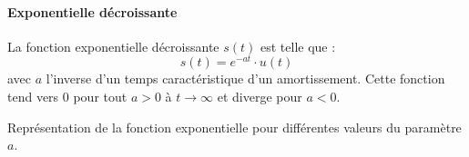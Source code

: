 \paragraph{Exponentielle décroissante}
La fonction exponentielle décroissante $s(t)$ est telle que :
\[
    s(t)=e^{-at}\cdot u(t)
\]
avec $a$ l'inverse d'un temps caractéristique d'un amortissement.
Cette fonction tend vers 0 pour tout $a>0$ à $t\rightarrow\infty$ et 
diverge pour $a<0$.
\begin{marginfigure}[-8em]
    \centering
    \resizebox{\linewidth}{!}{}
    \caption{Représentation de la fonction exponentielle pour 
             différentes valeurs du paramètre $a$.\label{fig-exp}}
\end{marginfigure}
